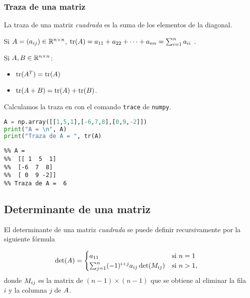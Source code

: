 \subsubsection{Traza de una matriz}

La traza de una matriz \emph{cuadrada} es la suma de los elementos de la diagonal.

Si $\Ab = (a_{ij}) \in \R^{n \times n}$, $\tr(\Ab) = a_{11} + a_{22} + \dots + a_{nn} = \sum_{i=1}^n a_{ii}$ .

\begin{proposicion} Si $\Ab, \Bb \in \R^{n \times n}$:
\begin{itemize}
\item $\tr(\Ab^T)=\tr(\Ab)$
\item $\tr(\Ab+\Bb) = \tr(\Ab) + \tr(\Bb)$.
\end{itemize}
\end{proposicion}

Calculamos la traza en \python con el comando \texttt{trace} de \texttt{numpy}.

\begin{Shaded}
\begin{lstlisting}[language=Python]
A = np.array([[1,5,1],[-6,7,8],[0,9,-2]])
print("A = \n", A)
print("Traza de A = ", tr(A)
\end{lstlisting}
\end{Shaded}

\begin{verbatim}
%% A =
%%  [[ 1  5  1]
%%  [-6  7  8]
%%  [ 0  9 -2]]
%% Traza de A =  6
\end{verbatim}

\subsection{Determinante de una matriz}

El determinante de una matriz \emph{cuadrada} se puede definir recursivamente por la siguiente fórmula

$$
\det(\Ab)= \begin{cases}
a_{11} & \text{si } n = 1 \\
\sum _{j=1}^{n}(-1)^{i+j}a_{ij} \det(\Mb_{ij}) & \text{si } n > 1,
\end{cases}
$$
donde $\Mb_{ij}$ es la matrix de $(n-1) \times (n-1)$ que se obtiene al eliminar la fila $i$ y la columna $j$ de $\Ab$.

